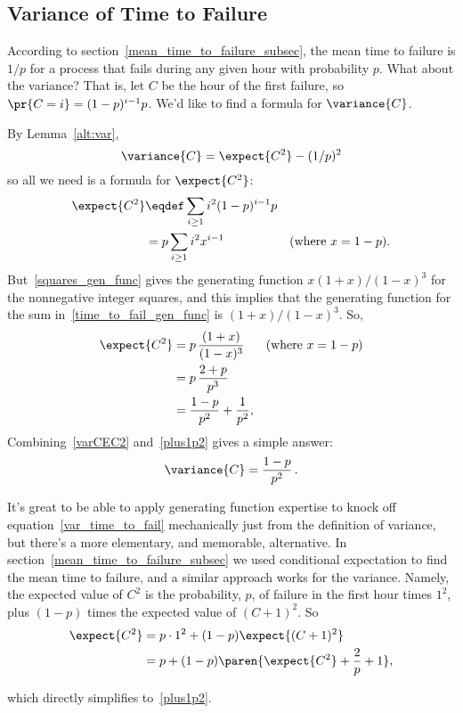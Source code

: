 \subsection{Variance of Time to Failure}
According to section~\ref{mean_time_to_failure_subsec}, the mean time to
failure is $1/p$ for a process that fails during any given hour with
probability $p$.  What about the variance?  That is, let $C$ be the hour
of the first failure, so $\pr{C=i} = (1-p)^{i-1}p$.  We'd like to find a
formula for $\variance{C}$.

By Lemma~\ref{alt:var},
\begin{equation}\label{varCEC2}
\variance{C} = \expect{C^2} - (1/p)^2
\end{equation}
so all we need is a formula for $\expect{C^2}$:
\begin{align}
\expect{C^2}
   & \eqdef \sum_{i\geq 1} i^2(1-p)^{i-1}p \notag\\ %
   & = p\sum_{i\geq 1} i^2x^{i-1} & \text{(where $x=1-p$)}\label{time_to_fail_gen_func}.
\end{align}
But~\eqref{squares_gen_func} gives the generating function
$x(1+x)/(1-x)^3$ for the nonnegative integer squares, and this implies that
the generating function for the sum in~\eqref{time_to_fail_gen_func} is
$(1+x)/(1-x)^3$.  So,
\begin{align}
\expect{C^2} & = p\, \frac{(1+x)}{(1-x)^3} & \text{(where $x=1-p$)}\notag\\
             & = p\, \frac{2+p}{p^3}\notag\\
             & = \frac{1-p}{p^2} + \frac{1}{p^2}\label{plus1p2},
\end{align}
Combining~\eqref{varCEC2} and~\eqref{plus1p2} gives a simple answer:
\begin{equation}\label{var_time_to_fail}
\variance{C} = \frac{1-p}{p^2} \,.
\end{equation}

It's great to be able to apply generating function expertise to knock off
equation~\eqref{var_time_to_fail} mechanically just from the definition of
variance, but there's a more elementary, and memorable, alternative.  In
section~\ref{mean_time_to_failure_subsec} we used conditional expectation
to find the mean time to failure, and a similar approach works for the
variance.  Namely, the expected value of $C^2$ is the probability, $p$, of
failure in the first hour times $1^2$, plus $(1-p)$ times the expected
value of $(C+1)^2$.  So
\begin{align*}
\expect{C^2} & = p\cdot 1^2 + (1-p)\expect{(C+1)^2}\\
             & = p + (1-p) \paren{\expect{C^2} + \frac{2}{p} +1},
\end{align*}
\iffalse
             & = p+ (1-p)\expect{C^2} + (1-p)\paren{\frac{2}{p} + 1}, \text{
               so}\\
p \expect{C^2} & = p+ (1-p)\paren{\frac{2}{p} + 1}\\
               & = \frac{p^2+(1-p)(2+p)}{p}\\
\expect{C^2} & = \frac{2 -p}{p^2}\\
             & =  frac{1-p}{p^2} + \frac{1}{p^2}
\fi
which directly simplifies to~\eqref{plus1p2}.

